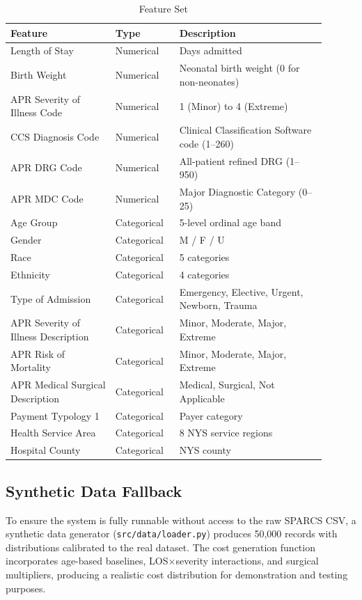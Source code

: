 \documentclass[11pt,a4paper]{article}
\begin{document}
\begin{table}[h]
\centering
\caption{Feature Set}
\label{tab:features}
\begin{tabular}{p{0.30\linewidth} p{0.18\linewidth} p{0.42\linewidth}}
\toprule
\textbf{Feature} & \textbf{Type} & \textbf{Description} \\
\midrule
Length of Stay & Numerical & Days admitted \\
Birth Weight & Numerical & Neonatal birth weight (0 for non-neonates) \\
APR Severity of Illness Code & Numerical & 1 (Minor) to 4 (Extreme) \\
CCS Diagnosis Code & Numerical & Clinical Classification Software code (1--260) \\
APR DRG Code & Numerical & All-patient refined DRG (1--950) \\
APR MDC Code & Numerical & Major Diagnostic Category (0--25) \\
Age Group & Categorical & 5-level ordinal age band \\
Gender & Categorical & M / F / U \\
Race & Categorical & 5 categories \\
Ethnicity & Categorical & 4 categories \\
Type of Admission & Categorical & Emergency, Elective, Urgent, Newborn, Trauma \\
APR Severity of Illness Description & Categorical & Minor, Moderate, Major, Extreme \\
APR Risk of Mortality & Categorical & Minor, Moderate, Major, Extreme \\
APR Medical Surgical Description & Categorical & Medical, Surgical, Not Applicable \\
Payment Typology 1 & Categorical & Payer category \\
Health Service Area & Categorical & 8 NYS service regions \\
Hospital County & Categorical & NYS county \\
\bottomrule
\end{tabular}
\end{table}

\subsection{Synthetic Data Fallback}
To ensure the system is fully runnable without access to the raw SPARCS CSV, a synthetic data generator (\texttt{src/data/loader.py}) produces 50,000 records with distributions calibrated to the real dataset. The cost generation function incorporates age-based baselines, LOS$\times$severity interactions, and surgical multipliers, producing a realistic cost distribution for demonstration and testing purposes.
\end{document}
